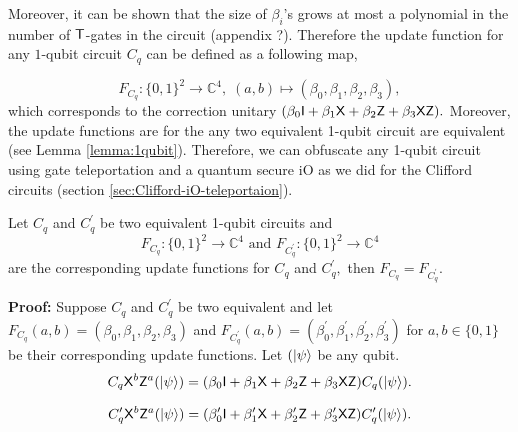 Moreover, it can be shown that the size of $\beta_i$'s grows at most a polynomial in the number of ${\sf T}$-gates in the circuit (appendix ?). Therefore the update function for any $1$-qubit circuit $C_q$ can be defined as a following map,

\begin{equation*}
F_{C_q}:\{0,1\}^2\rightarrow \mathbb{C}^4,\; (a,b)\mapsto (\beta_0, \beta_1,\beta_2,\beta_3),
\end{equation*}
which corresponds to the correction unitary $(\beta_0 {\sf I} +  \beta_1 {\sf X} + \beta_2 {\sf Z} + \beta_3{\sf X} {\sf Z}).$
Moreover, the update functions are for the any two equivalent 1-qubit circuit are equivalent (see Lemma \ref{lemma:1qubit}). Therefore, we can obfuscate any 1-qubit circuit using gate teleportation and a quantum secure iO as we did for the Clifford circuits (section \ref{sec:Clifford-iO-teleportaion}).



\begin{lemma}
\label{lemma:1qubit}
Let $C_q$ and $C_q^\prime$ be two equivalent 1-qubit circuits and 
\begin{equation*}
F_{C_q}:\{0,1\}^2\rightarrow \mathbb{C}^4 \mbox{ and } F_{C_q^\prime}:\{0,1\}^2\rightarrow \mathbb{C}^4
\end{equation*}
are the corresponding update functions for $C_q$ and $C_q^\prime,$  then $F_{C_q}=F_{C_q^\prime}.$
\end{lemma}

{\bf Proof:}  Suppose  $C_q$ and $C_q^\prime$ be two equivalent and let  $F_{C_q}(a,b)=(\beta_0, \beta_1, \beta_2, \beta_3)$ and $F_{C_q^\prime}(a,b)=(\beta_0^\prime, \beta_1^\prime, \beta_2^\prime, \beta_3^\prime)$ for $a,b\in\{0,1\}$ be their corresponding update functions. Let $({\lvert}\psi\rangle$ be any  qubit.
\begin{equation}
\label{lemma:1qubit:eq1}
\begin{aligned}
 C_q {\sf X}^b {\sf Z}^a({\lvert}\psi\rangle)=(\beta_0 {\sf I}+\beta_1 {\sf X}+\beta_2 {\sf Z}+\beta_3 {\sf X} {\sf Z})  C_q ({\lvert}\psi\rangle).\\
 \end{aligned}
\end{equation}

\begin{equation}
\label{lemma:1qubit:eq2}
\begin{aligned}
 C_q^\prime {\sf X}^b {\sf Z}^a({\lvert}\psi\rangle)=(\beta_0^\prime {\sf I}+\beta_1^\prime {\sf X}+\beta_2^\prime {\sf Z}+\beta_3^\prime {\sf X} {\sf Z})  C_q^\prime ({\lvert}\psi\rangle).
 \end{aligned}
\end{equation}

